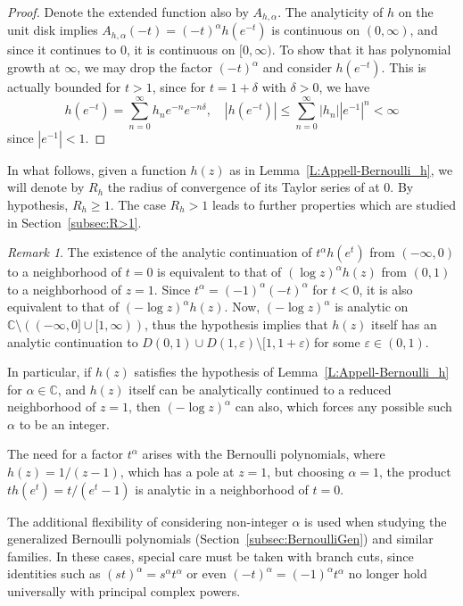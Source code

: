 \documentclass[11pt,a4paper]{amsart}
\newcommand{\C}{\mathbb{C}}
\theoremstyle{plain}
\theoremstyle{plain}
\theoremstyle{definition}
\theoremstyle{remark}
\newtheorem*{remark}{Remark}
\begin{document}
\begin{proof}
Denote the extended function also by $A_{h,\alpha}$. The analyticity of $h$ on the unit disk implies $A_{h,\alpha}(-t) = (-t)^{\alpha} h(e^{-t})$ is continuous on $(0,\infty)$, and since it continues to $0$, it is continuous on $[0,\infty)$. To show that it has polynomial growth at $\infty$, we may drop the factor $(-t)^{\alpha}$ and consider $h(e^{-t})$. This is actually bounded for $t > 1$, since for $t = 1 + \delta$ with $\delta > 0$, we have
\[
	h(e^{-t}) = \sum_{n=0}^{\infty} h_{n} e^{-n}e^{-n\delta},
	\quad
	|h(e^{-t})| \leq \sum_{n=0}^{\infty} |h_{n}|| e^{-1}|^n < \infty
\]
since $|e^{-1}| < 1$.
\end{proof}



In what follows, given a function $h(z)$ as in Lemma~\ref{L:Appell-Bernoulli_h}, we will denote by $R_{h}$ the radius of convergence of its Taylor series of at $0$. By hypothesis, $R_{h} \geq 1$. The case $R_{h} > 1$ leads to further properties which are studied in Section~\ref{subsec:R>1}.



\begin{remark}
The existence of the analytic continuation of $t^{\alpha} h(e^{t})$ from $(-\infty,0)$ to a neighborhood of $t=0$ is equivalent to that of $(\log z)^{\alpha} h(z)$ from $(0,1)$ to a neighborhood of $z=1$. Since $t^{\alpha} = (-1)^{\alpha} (-t)^{\alpha}$ for $t < 0$, it is also equivalent to that of $(-\log z)^{\alpha} h(z)$. Now, $(-\log z)^{\alpha}$ is analytic on $\C \setminus ((-\infty,0] \cup [1,\infty))$, thus the hypothesis implies that $h(z)$ itself has an analytic continuation to $D(0,1) \cup D(1,\varepsilon) \setminus [1,1+\varepsilon)$ for some $\varepsilon \in (0,1)$. 

In particular, if $h(z)$ satisfies the hypothesis of Lemma~\ref{L:Appell-Bernoulli_h} for $\alpha \in \C$, and $h(z)$ itself can be analytically continued to a reduced neighborhood of $z=1$, then $(-\log z)^{\alpha}$ can also, which forces any possible such $\alpha$ to be an integer.

The need for a factor $t^{\alpha}$ arises with the Bernoulli polynomials, where $h(z) = 1/(z-1)$, which has a pole at $z=1$, but choosing $\alpha = 1$, the product $t h(e^{t}) = t/(e^{t}-1)$ is analytic in a neighborhood of $t=0$.

The additional flexibility of considering non-integer $\alpha$ is used when studying the generalized Bernoulli polynomials (Section~\ref{subsec:BernoulliGen}) and similar families. In these cases, special care must be taken with branch cuts, since identities such as $(st)^{\alpha} = s^{\alpha} t^{\alpha}$ or even $(-t)^{\alpha} = (-1)^{\alpha} t^{\alpha}$ no longer hold universally with principal complex powers.
\end{remark}
\end{document}
